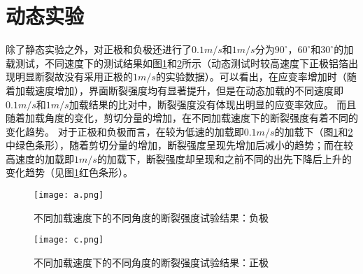 \section{动态实验}
除了静态实验之外，对正极和负极还进行了$0.1m/s$和$1m/s$分为$90^{\circ}$，$60^{\circ}$和$30^{\circ}$的加载测试，不同速度下的测试结果如图\ref{fig:a}和\ref{fig:c}所示（动态测试时较高速度下正极铝箔出现明显断裂故没有采用正极的$1m/s$的实验数据）。可以看出，在应变率增加时（随着加载速度增加），界面断裂强度均有显著提升，但是在动态加载的不同速度即$0.1m/s$和$1m/s$加载结果的比对中，断裂强度没有体现出明显的应变率效应。 而且随着加载角度的变化，剪切分量的增加，在不同加载速度下的断裂强度有着不同的变化趋势。 对于正极和负极而言，在较为低速的加载即$0.1m/s$的加载下（图\ref{fig:a}和\ref{fig:c}中绿色条形），随着剪切分量的增加，断裂强度呈现先增加后减小的趋势；而在较高速度的加载即$1m/s$的加载下，断裂强度却呈现和之前不同的出先下降后上升的变化趋势（见图\ref{fig:a}红色条形）。
\begin{figure}
\centering   
\texttt{[image: a.png]}
\caption{不同加载速度下的不同角度的断裂强度试验结果：负极} 
\label{fig:a}
\end{figure}
\begin{figure}
\centering   
\texttt{[image: c.png]}
\caption{不同加载速度下的不同角度的断裂强度试验结果：正极} 
\label{fig:c}
\end{figure}

